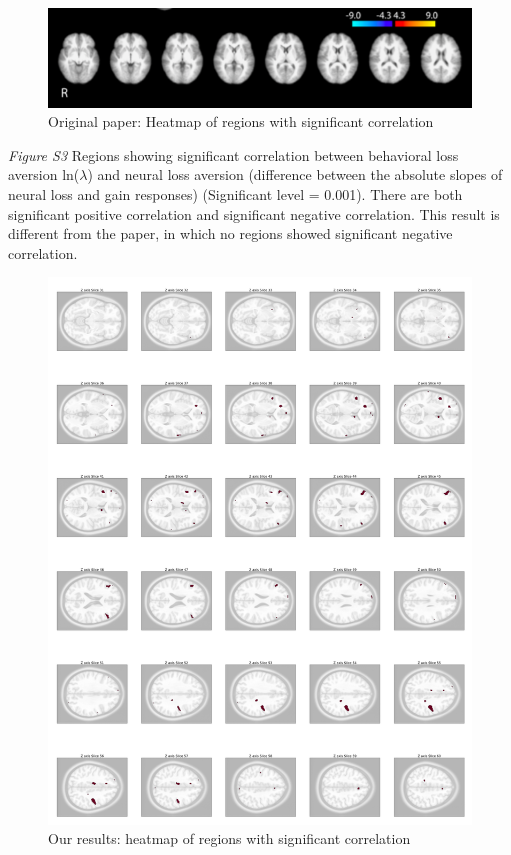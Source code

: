 \documentclass[11pt]{article}
\begin{document}
\begin{figure}[H]
    \centering
        \includegraphics[scale=0.5]{figures/Regression3/Orig_sig_cor_z_gain.png}
    \caption{Original paper: Heatmap of regions with significant correlation}
\end{figure}

\newpage

\emph{Figure S3} Regions showing significant correlation between behavioral 
loss aversion ln($\lambda$) and neural loss aversion (difference between the 
absolute slopes of neural loss and gain responses) (Significant level = 0.001). 
There are both significant positive correlation and significant negative 
correlation. This result is different from the paper, in which no regions 
showed significant negative correlation.

\begin{figure}[H]
\centering
\includegraphics[scale=0.105]{figures/Regression3/sig_cor_z_neural_aversion.png}
\caption{Our results: heatmap of regions with significant correlation}
\end{figure}
\end{document}
